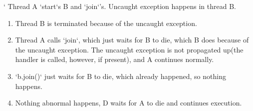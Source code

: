 \documentclass[a4paper, 12pt]{extarticle}
\begin{document}
\lstMakeShortInline`
Thread A `start`s B and `join`'s. Uncaught exception happens in thread B.
\begin{enumerate}
\item Thread B is terminated because of the uncaught exception.
\item Thread A calls `join`, which just waits for B to die, which B does because of the uncaught exception. The uncaught exception is not propagated up(the handler is called, however, if present), and A continues normally.
\item `b.join()` just waits for B to die, which already happened, so nothing happens.
\item Nothing abnormal happens, D waits for A to die and continues execution.
\end{enumerate}
\end{document}
